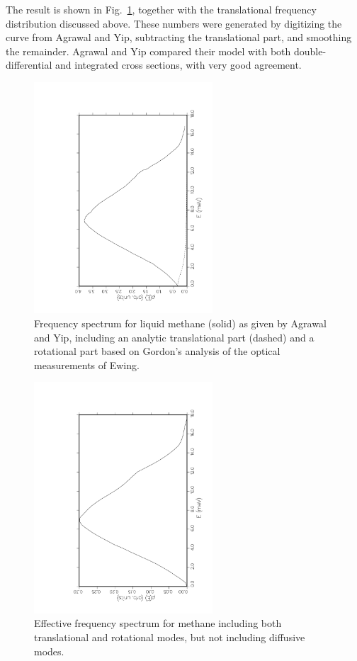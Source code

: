 The result is shown in Fig.~\ref{fig5}, together with the translational
frequency distribution discussed above.  These numbers were generated by
digitizing the curve from Agrawal and Yip, subtracting the translational
part, and smoothing the remainder.  Agrawal and Yip compared their model
with both double-differential and integrated cross sections, with very good
agreement.

\begin{figure}[t]\centering
\includegraphics[keepaspectratio, height=3.4in, angle=270]{figs/le5ack}
\caption[Agrawal-Yip frequency spectrum for liquid methane]
  {Frequency spectrum for liquid methane (solid) as given by
  Agrawal and Yip, including an analytic translational part (dashed)
  and a rotational part based on Gordon's analysis
  of the optical measurements of Ewing.}
\label{fig5}
\end{figure}

\begin{figure}[b]\centering
\includegraphics[keepaspectratio, height=3.4in, angle=270]{figs/le6ack}
\caption[Frequency spectrum for liquid methane with translational and
 rotational modes]{Effective frequency spectrum for methane including
 both translational and rotational modes, but not including diffusive modes.}
\label{fig6}
\end{figure}

